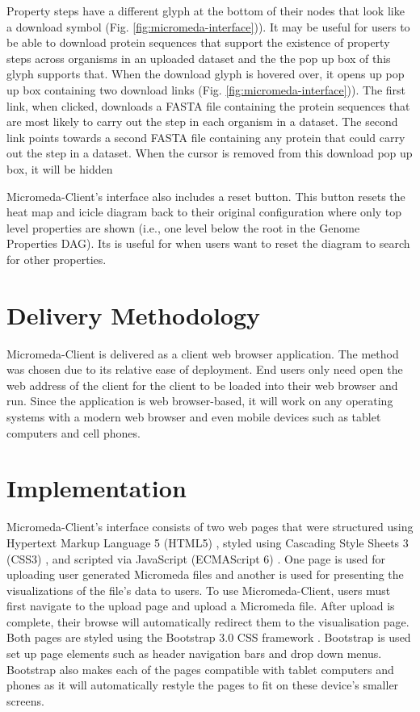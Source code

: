Property steps have a different glyph at the bottom of their nodes that look like a download symbol (Fig. \ref{fig:micromeda-interface})). It may be useful for users to be able to download protein sequences that support the existence of property steps across organisms in an uploaded dataset and the the pop up box of this glyph supports that. When the download glyph is hovered over, it opens up pop up box containing two download links (Fig. \ref{fig:micromeda-interface})). The first link, when clicked, downloads a FASTA file containing the protein sequences that are most likely to carry out the step in each organism in a dataset. The second link points towards a second FASTA file containing any protein that could carry out the step in a dataset. When the cursor is removed from this download pop up box, it will be hidden

Micromeda-Client's interface also includes a reset button. This button resets the heat map and icicle diagram back to their original configuration where only top level properties are shown (i.e., one level below the root in the Genome Properties DAG). Its is useful for when users want to reset the diagram to search for other properties.

\section{Delivery Methodology}

Micromeda-Client is delivered as a client web browser application. The method was chosen due to its relative ease of deployment. End users only need open the web address of the client for the client to be loaded into their web browser and run. Since the application is web browser-based, it will work on any operating systems with a modern web browser and even mobile devices such as tablet computers and cell phones.

\section{Implementation}

Micromeda-Client's interface consists of two web pages that were structured using Hypertext Markup Language 5 (HTML5) \cite{HTML5}, styled using Cascading Style Sheets 3 (CSS3) \cite{CSS3}, and scripted via JavaScript (ECMAScript 6) \cite{flanagan2006javascript}. One page is used for uploading user generated Micromeda files and another is used for presenting the visualizations of the file's data to users. To use Micromeda-Client, users must first navigate to the upload page and upload a Micromeda file. After upload is complete, their browse will automatically redirect them to the visualisation page. Both pages are styled using the Bootstrap 3.0 CSS framework \cite{spurlock2013bootstrap}. Bootstrap is used set up page elements such as header navigation bars and drop down menus. Bootstrap also makes each of the pages compatible with tablet computers and phones as it will automatically restyle the pages to fit on these device's smaller screens.

